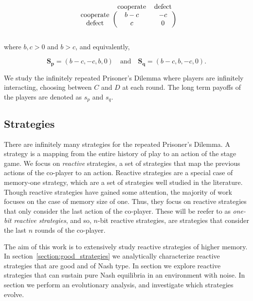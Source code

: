 \documentclass{article}
\theoremstyle{definition}
\begin{document}
\begin{equation}\label{eq:donation_payoffs}
  \begin{blockarray}{ccc}
      & \text{cooperate} & \text{defect} \\
      \begin{block}{c(cc)}
          \text{cooperate} & b - c & -c \\
          \text{defect} & c & 0 \\
      \end{block}
  \end{blockarray}
\end{equation}

where \(b, c > 0\) and \(b > c\), and equivalently,

\begin{equation}\label{eq:vector_donation_payoffs}
  \mathbf{ S_{p}} = (b-c, -c, b, 0) \quad \textrm{and} \quad  \mathbf{S_{q}} = (b - c, b, -c, 0).
\end{equation}

We study the infinitely repeated Prisoner's Dilemma where players
are infinitely interacting, choosing between \(C\) and \(D\) at each round. The
long term payoffs of the players are denoted as \(s_{p}\) and \(s_{q}\).

\subsection{Strategies}

There are infinitely many strategies for the repeated Prisoner's Dilemma. A
strategy is a mapping from the entire history of play to an action of the stage
game. We focus on \textit{reactive} strategies, a set of strategies that map the
previous actions of the co-player to an action. Reactive strategies are a
special case of memory-one strategy, which are a set of strategies well studied
in the literature. Though reactive strategies have gained some attention, the
majority of work focuses on the case of memory size of one. Thus, they focus on
reactive strategies that only consider the last action of the co-player. These
will be reefer to as \textit{one-bit reactive strategies}, and so, \(n\)-bit
reactive strategies, are strategies that consider the last \(n\) rounds of the
co-player.

The aim of this work is to extensively study reactive strategies of higher memory. In
section~\ref{section:good_strategies} we analytically characterize reactive
strategies that are good and of Nash type. In section we explore reactive
strategies that can sustain pure Nash equilibria in an environment with noise.
In section we perform an evolutionary analysis, and investigate which
strategies evolve.
\end{document}
